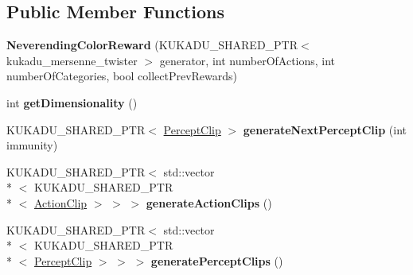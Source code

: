 \subsection*{Public Member Functions}
\begin{DoxyCompactItemize}
\item 
\hypertarget{classkukadu_1_1NeverendingColorReward_adb679e39345857002e31754eefb85c0f}{{\bfseries Neverending\-Color\-Reward} (K\-U\-K\-A\-D\-U\-\_\-\-S\-H\-A\-R\-E\-D\-\_\-\-P\-T\-R$<$ kukadu\-\_\-mersenne\-\_\-twister $>$ generator, int number\-Of\-Actions, int number\-Of\-Categories, bool collect\-Prev\-Rewards)}\label{classkukadu_1_1NeverendingColorReward_adb679e39345857002e31754eefb85c0f}

\item 
\hypertarget{classkukadu_1_1NeverendingColorReward_a9a58636526eb87b70c848e964a750036}{int {\bfseries get\-Dimensionality} ()}\label{classkukadu_1_1NeverendingColorReward_a9a58636526eb87b70c848e964a750036}

\item 
\hypertarget{classkukadu_1_1NeverendingColorReward_ac330bfc2bdb29562cd0d04b5b0c2b2e5}{K\-U\-K\-A\-D\-U\-\_\-\-S\-H\-A\-R\-E\-D\-\_\-\-P\-T\-R$<$ \hyperlink{classkukadu_1_1PerceptClip}{Percept\-Clip} $>$ {\bfseries generate\-Next\-Percept\-Clip} (int immunity)}\label{classkukadu_1_1NeverendingColorReward_ac330bfc2bdb29562cd0d04b5b0c2b2e5}

\item 
\hypertarget{classkukadu_1_1NeverendingColorReward_a0f346a8d39232fa23db7dedd7558c5c3}{K\-U\-K\-A\-D\-U\-\_\-\-S\-H\-A\-R\-E\-D\-\_\-\-P\-T\-R$<$ std\-::vector\\*
$<$ K\-U\-K\-A\-D\-U\-\_\-\-S\-H\-A\-R\-E\-D\-\_\-\-P\-T\-R\\*
$<$ \hyperlink{classkukadu_1_1ActionClip}{Action\-Clip} $>$ $>$ $>$ {\bfseries generate\-Action\-Clips} ()}\label{classkukadu_1_1NeverendingColorReward_a0f346a8d39232fa23db7dedd7558c5c3}

\item 
\hypertarget{classkukadu_1_1NeverendingColorReward_aed748e7ccf5eb06b37bad79f0b0fb2d8}{K\-U\-K\-A\-D\-U\-\_\-\-S\-H\-A\-R\-E\-D\-\_\-\-P\-T\-R$<$ std\-::vector\\*
$<$ K\-U\-K\-A\-D\-U\-\_\-\-S\-H\-A\-R\-E\-D\-\_\-\-P\-T\-R\\*
$<$ \hyperlink{classkukadu_1_1PerceptClip}{Percept\-Clip} $>$ $>$ $>$ {\bfseries generate\-Percept\-Clips} ()}\label{classkukadu_1_1NeverendingColorReward_aed748e7ccf5eb06b37bad79f0b0fb2d8}

\end{DoxyCompactItemize}
